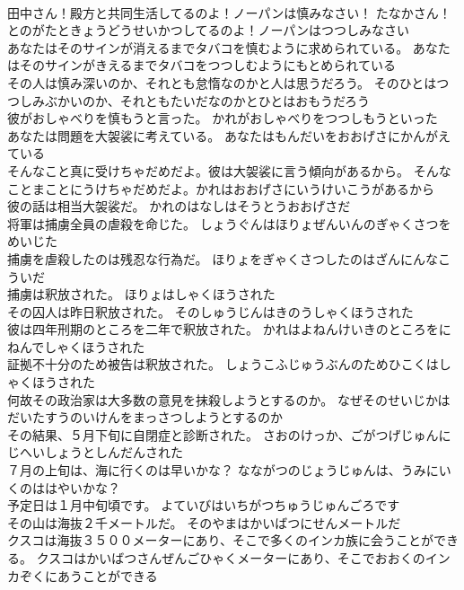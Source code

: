 \documentclass[8pt]{extreport}
\begin{document}
\begin{CJK}{UTF8}{min}
\\	田中さん！殿方と共同生活してるのよ！ノーパンは慎みなさい！	たなかさん！とのがたときょうどうせいかつしてるのよ！ノーパンはつつしみなさい 
\\	あなたはそのサインが消えるまでタバコを慎むように求められている。	あなたはそのサインがきえるまでタバコをつつしむようにもとめられている 
\\	その人は慎み深いのか、それとも怠惰なのかと人は思うだろう。	そのひとはつつしみぶかいのか、それともたいだなのかとひとはおもうだろう 
\\	彼がおしゃべりを慎もうと言った。	かれがおしゃべりをつつしもうといった 
\\	あなたは問題を大袈裟に考えている。	あなたはもんだいをおおげさにかんがえている 
\\	そんなこと真に受けちゃだめだよ。彼は大袈裟に言う傾向があるから。	そんなことまことにうけちゃだめだよ。かれはおおげさにいうけいこうがあるから 
\\	彼の話は相当大袈裟だ。	かれのはなしはそうとうおおげさだ 
\\	将軍は捕虜全員の虐殺を命じた。	しょうぐんはほりょぜんいんのぎゃくさつをめいじた 
\\	捕虜を虐殺したのは残忍な行為だ。	ほりょをぎゃくさつしたのはざんにんなこういだ 
\\	捕虜は釈放された。	ほりょはしゃくほうされた 
\\	その囚人は昨日釈放された。	そのしゅうじんはきのうしゃくほうされた 
\\	彼は四年刑期のところを二年で釈放された。	かれはよねんけいきのところをにねんでしゃくほうされた 
\\	証拠不十分のため被告は釈放された。	しょうこふじゅうぶんのためひこくはしゃくほうされた 
\\	何故その政治家は大多数の意見を抹殺しようとするのか。	なぜそのせいじかはだいたすうのいけんをまっさつしようとするのか 
\\	その結果、５月下旬に自閉症と診断された。	さおのけっか、ごがつげじゅんにじへいしょうとしんだんされた 
\\	７月の上旬は、海に行くのは早いかな？	なながつのじょうじゅんは、うみにいくのははやいかな？ 
\\	予定日は１月中旬頃です。	よていびはいちがつちゅうじゅんごろです 
\\	その山は海抜２千メートルだ。	そのやまはかいばつにせんメートルだ 
\\	クスコは海抜３５００メーターにあり、そこで多くのインカ族に会うことができる。	クスコはかいばつさんぜんごひゃくメーターにあり、そこでおおくのインカぞくにあうことができる 

\end{CJK}
\end{document}
